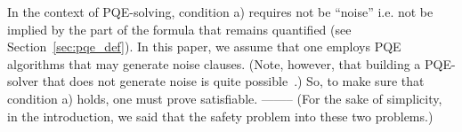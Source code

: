 In the context of PQE-solving, condition a) requires  not be
``noise'' i.e. not be implied by the part of the formula that remains
quantified (see Section~\ref{sec:pqe_def}). In this paper, we assume
that one employs PQE algorithms that may generate noise
clauses. (Note, however, that building a PQE-solver that does not
generate noise is quite possible~\cite{clean_pqe}.)  So, to make sure
that condition a) holds, one must prove  satisfiable.
--------
(For the sake of simplicity, in the
introduction, we said that \PP {} the safety problem into
these two problems.)  

